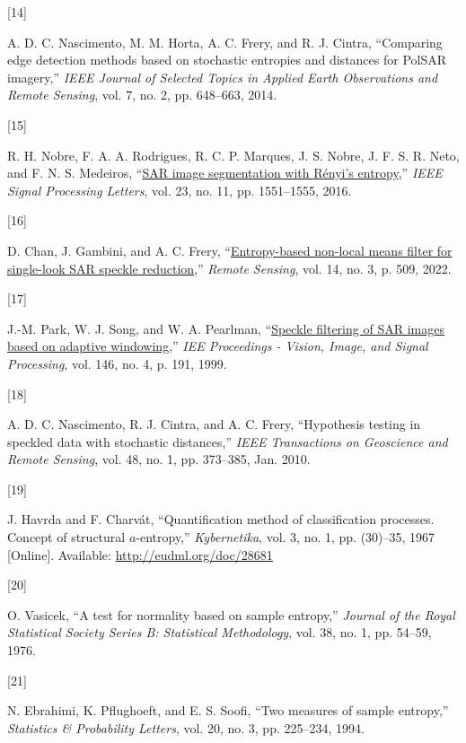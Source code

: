 \documentclass[
  lettersize  journal,
]{IEEEtran}%
\newlength{\cslhangindent}
\newlength{\csllabelwidth}
\newenvironment{CSLReferences}[2] %
 {\begin{list}{}{%
  \setlength{\itemindent}{0pt}
  \setlength{\leftmargin}{0pt}
  \setlength{\parsep}{0pt}
  \ifodd #1
   \setlength{\leftmargin}{\cslhangindent}
   \setlength{\itemindent}{-1\cslhangindent}
  \fi
  \setlength{\itemsep}{#2\baselineskip}}}
 {\end{list}}
\newcommand{\CSLLeftMargin}[1]{\parbox[t]{\csllabelwidth}{\strut#1\strut}}
\newcommand{\CSLRightInline}[1]{\parbox[t]{\linewidth - \csllabelwidth}{\strut#1\strut}}
\begin{document}
\begin{CSLReferences}{0}{0}
\CSLLeftMargin{{[}14{]} }%
\CSLRightInline{A. D. C. Nascimento, M. M. Horta, A. C. Frery, and R. J.
Cintra, {``Comparing edge detection methods based on stochastic
entropies and distances for {PolSAR} imagery,''} \emph{{IEEE} Journal of
Selected Topics in Applied Earth Observations and Remote Sensing}, vol.
7, no. 2, pp. 648--663, 2014. }

\CSLLeftMargin{{[}15{]} }%
\CSLRightInline{R. H. Nobre, F. A. A. Rodrigues, R. C. P. Marques, J. S.
Nobre, J. F. S. R. Neto, and F. N. S. Medeiros,
{``\href{https://doi.org/10.1109/lsp.2016.2606760}{SAR image
segmentation with {R}ényi's entropy},''} \emph{IEEE Signal Processing
Letters}, vol. 23, no. 11, pp. 1551--1555, 2016. }

\CSLLeftMargin{{[}16{]} }%
\CSLRightInline{D. Chan, J. Gambini, and A. C. Frery,
{``\href{https://doi.org/10.3390/rs14030509}{Entropy-based non-local
means filter for single-look SAR speckle reduction},''} \emph{Remote
Sensing}, vol. 14, no. 3, p. 509, 2022. }

\CSLLeftMargin{{[}17{]} }%
\CSLRightInline{J.-M. Park, W. J. Song, and W. A. Pearlman,
{``\href{https://doi.org/10.1049/ip-vis:19990550}{Speckle filtering of
SAR images based on adaptive windowing},''} \emph{IEE Proceedings -
Vision, Image, and Signal Processing}, vol. 146, no. 4, p. 191, 1999. }

\CSLLeftMargin{{[}18{]} }%
\CSLRightInline{A. D. C. Nascimento, R. J. Cintra, and A. C. Frery,
{``Hypothesis testing in speckled data with stochastic distances,''}
\emph{{IEEE} Transactions on Geoscience and Remote Sensing}, vol. 48,
no. 1, pp. 373--385, Jan. 2010. }

\CSLLeftMargin{{[}19{]} }%
\CSLRightInline{J. Havrda and F. Charvát, {``Quantification method of
classification processes. Concept of structural \(a\)-entropy,''}
\emph{Kybernetika}, vol. 3, no. 1, pp. (30)--35, 1967 {[}Online{]}.
Available: \url{http://eudml.org/doc/28681}}

\CSLLeftMargin{{[}20{]} }%
\CSLRightInline{O. Vasicek, {``A test for normality based on sample
entropy,''} \emph{Journal of the Royal Statistical Society Series B:
Statistical Methodology}, vol. 38, no. 1, pp. 54--59, 1976. }

\CSLLeftMargin{{[}21{]} }%
\CSLRightInline{N. Ebrahimi, K. Pflughoeft, and E. S. Soofi, {``Two
measures of sample entropy,''} \emph{Statistics \& Probability Letters},
vol. 20, no. 3, pp. 225--234, 1994. }


\end{CSLReferences}
\end{document}
